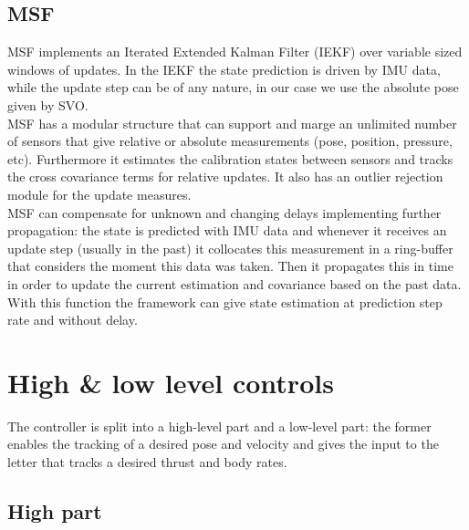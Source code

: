 

\subsection{MSF}
MSF implements an Iterated Extended Kalman Filter (IEKF) \cite{bell1993iterated} over variable sized windows of updates. In the IEKF  the state prediction is driven by IMU data, while the update step can be of any nature, in our case we use the absolute pose given by SVO.\\
MSF has a modular structure that can support and marge an unlimited number of sensors that give relative or absolute measurements (pose, position, pressure, etc). Furthermore it estimates the calibration states between sensors and tracks the cross covariance terms for relative updates. It also has an outlier rejection module for the update measures.\\
MSF can compensate for unknown and changing delays implementing further propagation: the state is predicted with IMU data and whenever it receives an update step (usually in the past) it collocates this measurement in a ring-buffer that considers the moment this data was taken. Then it propagates this in time in order to update the current estimation and covariance based on the past data. With this function the framework can give state estimation at prediction step rate and without delay.


\section{High \& low level controls}
The controller is split into a high-level part and a low-level part: the former enables the tracking of a desired  pose and velocity and gives the input to the letter that tracks a desired thrust and body rates.\\

\subsection{High part}\label{sec:high_control}

